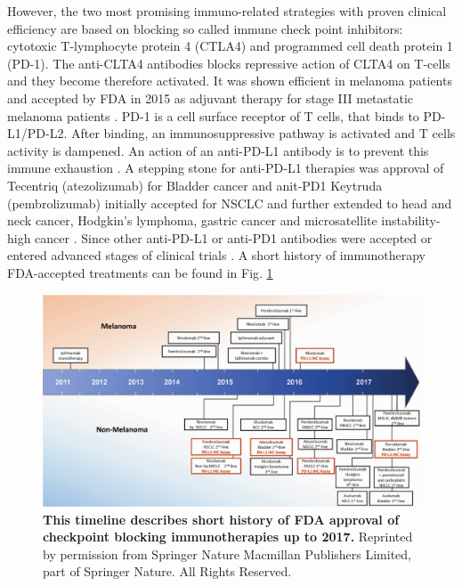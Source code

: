 \documentclass[12pt,]{book}
\theoremstyle{definition}
\theoremstyle{definition}
\theoremstyle{definition}
\theoremstyle{remark}
\begin{document}
However, the two most promising immuno-related strategies with proven
clinical efficiency are based on blocking so called immune check point
inhibitors: cytotoxic T-lymphocyte protein 4 (CTLA4) and programmed cell
death protein 1 (PD-1). The anti-CLTA4 antibodies blocks repressive
action of CLTA4 on T-cells and they become therefore activated. It was
shown efficient in melanoma patients and accepted by FDA in 2015 as
adjuvant therapy for stage III metastatic melanoma patients
\citep{FDACTLA4}. PD-1 is a cell surface receptor of T cells, that binds
to PD-L1/PD-L2. After binding, an immunosuppressive pathway is activated
and T cells activity is dampened. An action of an anti-PD-L1 antibody is
to prevent this immune exhaustion \citep{Chen2017}. A stepping stone for
anti-PD-L1 therapies was approval of Tecentriq (atezolizumab) for
Bladder cancer \citep{FDAPDL1Bladder} and anit-PD1 Keytruda
(pembrolizumab) initially accepted for NSCLC and further extended to
head and neck cancer, Hodgkin's lymphoma, gastric cancer and
microsatellite instability-high cancer \citep{FDAPDL1NSCLC}. Since other
anti-PD-L1 or anti-PD1 antibodies were accepted or entered advanced
stages of clinical trials \citep{Wolchok2015}. A short history of
immunotherapy FDA-accepted treatments can be found in Fig.
\ref{fig:timeline-immunotherapies}

\begin{figure}

{\centering \includegraphics[width=1\linewidth]{figures-ext/02-timeline-immunotherapies} 

}

\caption{\textbf{This timeline describes
short history of FDA approval of checkpoint blocking immunotherapies up
to 2017.} Reprinted by permission from Springer Nature
\citep{Taube2017a} Macmillan Publishers Limited, part of Springer
Nature. All Rights Reserved.}\label{fig:timeline-immunotherapies}
\end{figure}
\end{document}
